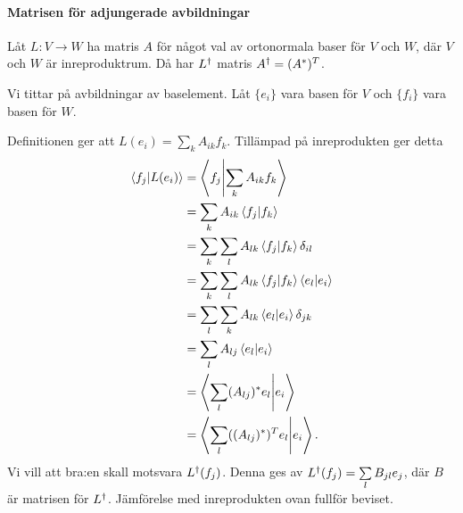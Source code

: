 \paragraph{Matrisen för adjungerade avbildningar}
Låt $L: V\to W$ ha matris $A$ för något val av ortonormala baser för $V$ och $W$, där $V$ och $W$ är inreproduktrum. Då har $L^{\dagger}$ matris $A^{\dagger} = (A^{*})^{T}$.

\proof
Vi tittar på avbildningar av baselement. Låt $\{e_{i}\}$ vara basen för $V$ och $\{f_{i}\}$ vara basen för $W$.

Definitionen ger att $L(e_{i}) = \sum\limits_{k}A_{ik}f_{k}$. Tillämpad på inreprodukten ger detta
\begin{align*}
	\bra{f_{j}}\ket{L(e_{i})} &= \bra{f_{j}}\ket{\sum\limits_{k}A_{ik}f_{k}} \\
	                         &= \sum\limits_{k}A_{ik}\bra{f_{j}}\ket{f_{k}} \\
	                         &= \sum\limits_{k}\sum\limits_{l}A_{lk}\bra{f_{j}}\ket{f_{k}}\delta_{il} \\
	                         &= \sum\limits_{k}\sum\limits_{l}A_{lk}\bra{f_{j}}\ket{f_{k}}\bra{e_{l}}\ket{e_{i}} \\
	                         &= \sum\limits_{l}\sum\limits_{k}A_{lk}\bra{e_{l}}\ket{e_{i}}\delta_{jk} \\
	                         &= \sum\limits_{l}A_{lj}\bra{e_{l}}\ket{e_{i}} \\
	                         &= \bra{\sum\limits_{l}(A_{lj})^{*}e_{l}}\ket{e_{i}} \\
	                         &= \bra{\sum\limits_{l}((A_{lj})^{*})^{T}e_{l}}\ket{e_{i}}.
\end{align*}
Vi vill att bra:en skall motsvara $L^{\dagger}(f_{j})$. Denna ges av $L^{\dagger}(f_{j}) = \sum\limits_{l}B_{jl}e_{j}$, där $B$ är matrisen för $L^{\dagger}$. Jämförelse med inreprodukten ovan fullför beviset.